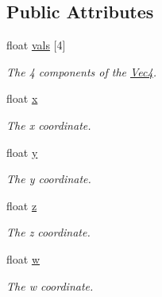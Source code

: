 \subsection*{Public Attributes}
\begin{DoxyCompactItemize}
\item 
float \hyperlink{structgfxmath_1_1_vec4_aa668d284af0138ed1d09663fb0bd3d6f}{vals} \mbox{[}4\mbox{]}
\begin{DoxyCompactList}\small\item\em The 4 components of the \hyperlink{structgfxmath_1_1_vec4}{Vec4}. \end{DoxyCompactList}\item 
float \hyperlink{structgfxmath_1_1_vec4_a273598aff75406f0e7a47121b8b06037}{x}
\begin{DoxyCompactList}\small\item\em The x coordinate. \end{DoxyCompactList}\item 
float \hyperlink{structgfxmath_1_1_vec4_a95e0ca27d66d7e0223606c20d326b595}{y}
\begin{DoxyCompactList}\small\item\em The y coordinate. \end{DoxyCompactList}\item 
float \hyperlink{structgfxmath_1_1_vec4_acd626b757468a5ea39f98812a36c4419}{z}
\begin{DoxyCompactList}\small\item\em The z coordinate. \end{DoxyCompactList}\item 
float \hyperlink{structgfxmath_1_1_vec4_adf2769a47b464dfee8d04e191f21701e}{w}
\begin{DoxyCompactList}\small\item\em The w coordinate. \end{DoxyCompactList}\end{DoxyCompactItemize}
